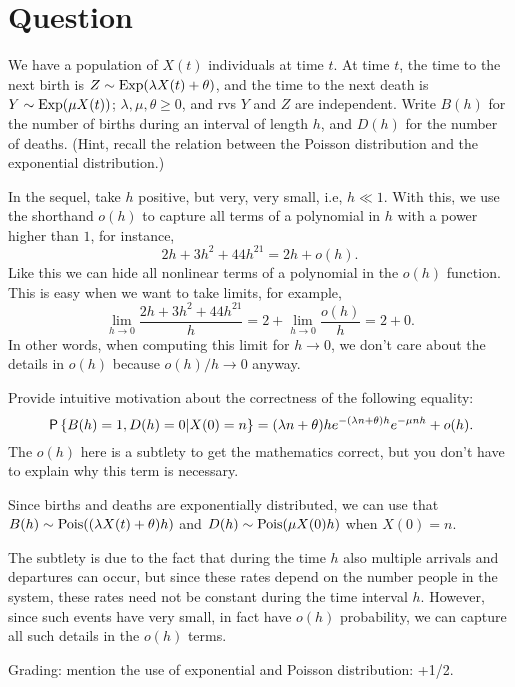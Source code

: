 \section*{Question}


We have a population of $X(t)$ individuals at time $t$. At time $t$, the time to the next birth is $Z\sim\Exp{\lambda X(t)+\theta}$, and the time to the next death is $Y\sim \Exp{\mu X(t)}$; $\lambda, \mu, \theta \geq 0$, and  rvs $Y$ and $Z$ are independent. Write $B(h)$ for the number of births during an interval of length $h$, and $D(h)$ for the number of deaths. (Hint, recall the relation between the Poisson distribution and the exponential distribution.)

In the sequel, take $h$ positive, but very, very small, i.e, $h\ll 1$. With this, we use the shorthand $o(h)$ to capture all terms of a polynomial in $h$ with a power higher than $1$, for instance,
\begin{equation}
  2h + 3 h^2+ 44 h^{21} = 2h + o(h).
\end{equation}
Like this we can hide all nonlinear terms of a polynomial in the $o(h)$ function. This is easy when we want to take limits, for example,
\begin{equation}
  \lim_{h\to 0} \frac{2h + 3h^{2} + 44 h^{21}} h
= 2 +  \lim_{h\to 0} \frac{o(h)} h  = 2 + 0.
\end{equation}
In other words, when computing this limit for $h\to 0$, we don't care about the details in $o(h)$ because $o(h)/h\to0$ anyway.

\begin{exercise}[1]
Provide intuitive motivation about the correctness of the following equality:
\begin{equation}
\P{B(h)=1, D(h)=0|X(0) = n } = (\lambda n  +\theta) h e^{-(\lambda n+\theta)h} e^{-\mu n h} + o(h).
\end{equation}
The $o(h)$ here is a subtlety to get the mathematics correct, but you  don't have to explain why this term is necessary.
\begin{solution}
Since births and deaths  are exponentially distributed, we can use that $B(h) \sim \Pois{(\lambda X(t) + \theta)h}$ and $D(h) \sim \Pois{\mu X(0) h}$ when $X(0) = n$.

The subtlety is due to the fact that  during the time $h$ also multiple arrivals and  departures  can occur, but since these rates depend on the number people in the system, these rates need not be constant during the time interval $h$.
However, since such events have very small, in fact have $o(h)$ probability, we can capture all such details in the $o(h)$ terms.

Grading: mention the use of exponential and Poisson distribution: +1/2.
\end{solution}
\end{exercise}

